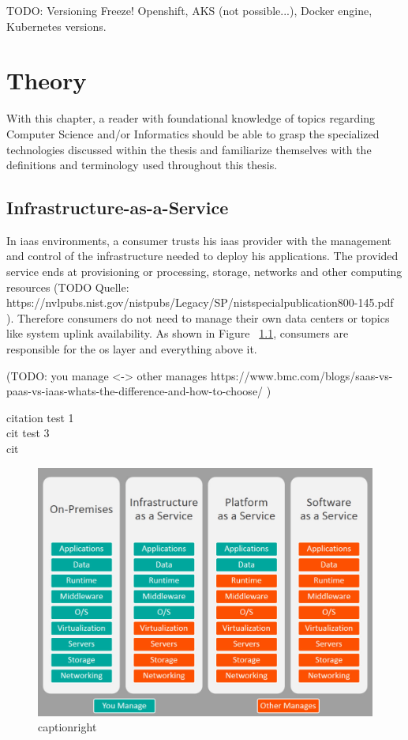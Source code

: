 TODO: Versioning Freeze! Openshift, AKS (not possible...), Docker engine, Kubernetes versions.




\chapter{Theory}
With this chapter, a reader with foundational knowledge of topics regarding Computer Science and/or Informatics should be able to grasp the specialized technologies discussed within the thesis and familiarize themselves with the definitions and terminology used throughout this thesis.

\section{Infrastructure-as-a-Service}
In \gls{iaas} environments, a consumer trusts his \gls{iaas} provider with the management and control of the infrastructure needed to deploy his applications.
The provided service ends at provisioning or processing, storage, networks and other computing resources \cite{nistcloud}
(TODO Quelle: https://nvlpubs.nist.gov/nistpubs/Legacy/SP/nistspecialpublication800-145.pdf ). 
Therefore consumers do not need to manage their own data centers or topics like system uplink availability.
As shown in Figure ~\ref{fig:servicecomparison}, consumers are responsible for the \gls{os} layer and everything above it.

(TODO: you manage <-> other manages https://www.bmc.com/blogs/saas-vs-paas-vs-iaas-whats-the-difference-and-how-to-choose/ )

citation test 1\cite{servicecomparison} \\
cit test 3~\cite{servicecomparison} \\
cit 

\begin{figure}[H]
\includegraphics[scale=0.4]{pictures/ServiceComparison.jpg} 
\caption{captionright\protect\footnotemark}
\label{fig:servicecomparison}
\end{figure}

